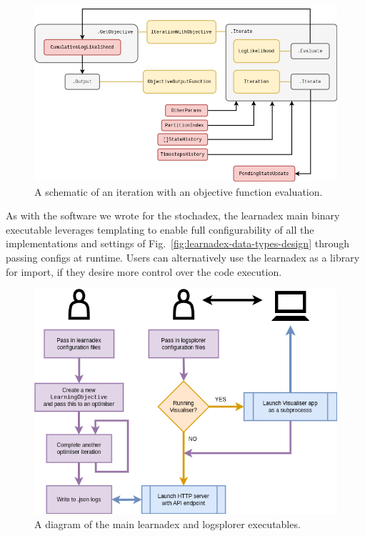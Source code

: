 \begin{figure}[h]
\centering
\includegraphics[width=14cm]{images/chapter-4-learnadex-data-iterator.drawio.png}
\caption{A schematic of an iteration with an objective function evaluation.}
\label{fig:learnadex-data-iterator}
\end{figure}

As with the software we wrote for the stochadex, the learnadex main binary executable leverages templating to enable full configurability of all the implementations and settings of Fig.~\ref{fig:learnadex-data-types-design} through passing configs at runtime. Users can alternatively use the learnadex as a library for import, if they desire more control over the code execution. 

\begin{figure}[h]
\centering
\includegraphics[width=13cm]{images/chapter-4-learnadex-main.drawio.png}
\caption{A diagram of the main learnadex and logsplorer executables.}
\label{fig:learnadex-main}
\end{figure}
    